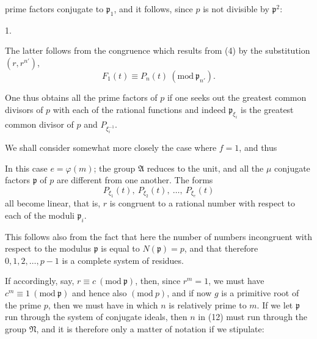 prime factors conjugate to $\mathfrak p_1$, and it follows,
since $p$ is not divisible by $\mathfrak p^2$:

1. 

The latter follows from the congruence which results from (4)
by the substitution $(r, r^{n'})$,
\[
F_1(t) \equiv P_n(t) \ (\mathrm{mod}\ \mathfrak p_{n'}).
\]

One thus obtains all the prime factors of $p$ if one
seeks out the greatest common divisors of $p$ with each
of the rational functions
and indeed $\mathfrak p_{\xi_i}$ is the greatest common divisor
of $p$ and $P_{\xi_i^{-1}}$.

We shall consider somewhat more closely the case where $f=1$,
and thus

In this case $e = \varphi(m)$; the group $\mathfrak A$ reduces
to the unit, and all the $\mu$ conjugate factors $\mathfrak p$
of $p$ are different from one another. The forms
\[
P_{\xi_1}(t),\ P_{\xi_2}(t),\ \ldots,\ P_{\xi_e}(t)
\]
all become linear, that is, $r$ is congruent to a rational number
with respect to each of the moduli $\mathfrak p_i$.

This follows also from the fact that here the number of
numbers incongruent with respect to the modulus $\mathfrak p$ is equal to $N(\mathfrak p) = p$,
and that therefore $0, 1, 2, \ldots, p-1$ is a complete system of residues.

If accordingly, say, $r \equiv c \ (\mathrm{mod}\ \mathfrak p)$, then, since $r^m = 1$,
we must have $c^m \equiv 1 \ (\mathrm{mod}\ \mathfrak p)$ and hence also $(\mathrm{mod}\ p)$, and if
now $g$ is a primitive root of the prime $p$, then we must have
in which $n$ is relatively prime to $m$. If we let $\mathfrak p$ run through
the system of conjugate ideals, then $n$ in (12) must run through the
group $\mathfrak N$, and it is therefore only a matter of notation
if we stipulate:
